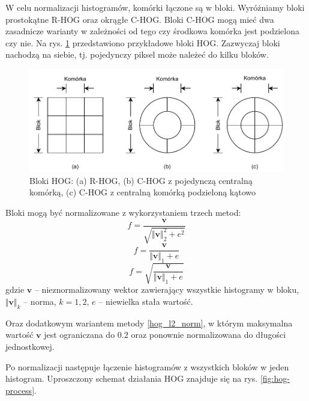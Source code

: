 W celu normalizacji histogramów, komórki łączone są w bloki. Wyróżniamy bloki prostokątne R-HOG oraz okrągłe C-HOG. Bloki C-HOG mogą mieć dwa zasadnicze warianty w zależności od tego czy środkowa komórka jest podzielona czy nie. Na rys. \ref{fig:hog-blocks} przedstawiono przykładowe bloki HOG. Zazwyczaj bloki nachodzą na siebie, tj. pojedynczy piksel może należeć do kilku bloków.

\begin{figure}[h]
	\centering
	\includegraphics[scale=1.0]{graphics/01_podstawy_teoretyczne/hog-blocks.pdf}
	\caption{ Bloki HOG: (a) R-HOG, (b) C-HOG z pojedynczą centralną komórką, (c) C-HOG z centralną komórką podzieloną kątowo }
	\label{fig:hog-blocks}
\end{figure}

Bloki mogą być normalizowane z wykorzystaniem trzech metod:
\begin{equation} 
\label{hog_l2_norm} 
f = \frac{\boldsymbol{v}}{\sqrt{ {\Vert \boldsymbol{v} \Vert}_2^2 + e^2 }}
\end{equation}
\begin{equation} 
\label{hog_l1_norm} 
f = \frac{\boldsymbol{v}}{ {\Vert \boldsymbol{v} \Vert}_1 + e }
\end{equation}
\begin{equation} 
\label{hog_l1_sqrt} 
f = \sqrt{\frac{\boldsymbol{v}}{ {\Vert \boldsymbol{v} \Vert}_1 + e }}
\end{equation} gdzie $\boldsymbol{v}$ -- nieznormalizowany wektor zawierający wszystkie histogramy w bloku, ${\Vert \boldsymbol{v} \Vert}_k$ -- norma, $k = 1, 2$, $e$ -- niewielka stała wartość.

Oraz dodatkowym wariantem metody \ref{hog_l2_norm}, w którym maksymalna wartość $\boldsymbol{v}$ jest ograniczana do $0.2$ oraz ponownie normalizowana do długości jednostkowej.

Po normalizacji następuje łączenie histogramów z wszystkich bloków w jeden histogram. Uproszczony schemat działania HOG znajduje się na rys. \ref{fig:hog-process}.

